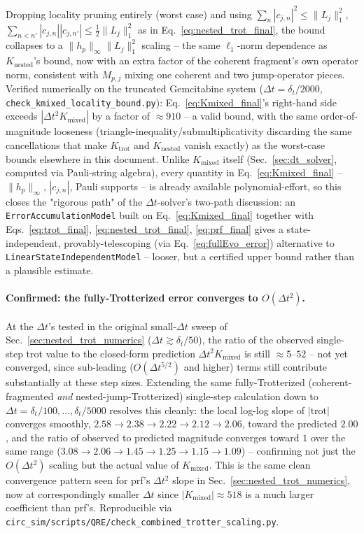 \documentclass[11pt]{article}
\newcommand{\Dt}{\Delta t}
\begin{document}
Dropping locality pruning entirely (worst case) and using $\sum_n|c_{j,n}|^2\le\|L_j\|_1^2$, $\sum_{n<n'}|c_{j,n}||c_{j,n'}|\le\tfrac12\|L_j\|_1^2$ as in Eq.~\eqref{eq:nested_trot_final}, the bound collapses to a $\|h_p\|_\infty\|L_j\|_1^2$ scaling -- the same $\ell_1$-norm dependence as $K_{\text{nested}}$'s bound, now with an extra factor of the coherent fragment's own operator norm, consistent with $M_{p,j}$ mixing one coherent and two jump-operator pieces. Verified numerically on the truncated Gemcitabine system ($\Dt=\delta_t/2000$, \texttt{check\_kmixed\_locality\_bound.py}): Eq.~\eqref{eq:Kmixed_final}'s right-hand side exceeds $|\Dt^2K_{\text{mixed}}|$ by a factor of $\approx910$ -- a valid bound, with the same order-of-magnitude looseness (triangle-inequality/submultiplicativity discarding the same cancellations that make $K_{\text{trot}}$ and $K_{\text{nested}}$ vanish exactly) as the worst-case bounds elsewhere in this document. Unlike $K_{\text{mixed}}$ itself (Sec.~\ref{sec:dt_solver}, computed via Pauli-string algebra), every quantity in Eq.~\eqref{eq:Kmixed_final} -- $\|h_p\|_\infty$, $|c_{j,n}|$, Pauli supports -- is already available polynomial-effort, so this closes the "rigorous path" of the $\Dt$-solver's two-path discussion: an \texttt{ErrorAccumulationModel} built on Eq.~\eqref{eq:Kmixed_final} together with Eqs.~\eqref{eq:trot_final}, \eqref{eq:nested_trot_final}, \eqref{eq:prf_final} gives a state-independent, provably-telescoping (via Eq.~\eqref{eq:fullEvo_error}) alternative to \texttt{LinearStateIndependentModel} -- looser, but a certified upper bound rather than a plausible estimate.

\paragraph{Confirmed: the fully-Trotterized error converges to \texorpdfstring{$O(\Dt^2)$}{O(Dt\^{}2)}.} At the $\Dt$'s tested in the original small-$\Dt$ sweep of Sec.~\ref{sec:nested_trot_numerics} ($\Dt\gtrsim\delta_t/50$), the ratio of the observed single-step trot value to the closed-form prediction $\Dt^2K_{\text{mixed}}$ is still $\approx5$--$52$ -- not yet converged, since sub-leading ($O(\Dt^{5/2})$ and higher) terms still contribute substantially at these step sizes. Extending the same fully-Trotterized (coherent-fragmented \emph{and} nested-jump-Trotterized) single-step calculation down to $\Dt=\delta_t/100,\ldots,\delta_t/5000$ resolves this cleanly: the local log-log slope of $|\text{trot}|$ converges smoothly, $2.58\to2.38\to2.22\to2.12\to2.06$, toward the predicted $2.00$, and the ratio of observed to predicted magnitude converges toward $1$ over the same range ($3.08\to2.06\to1.45\to1.25\to1.15\to1.09$) -- confirming not just the $O(\Dt^2)$ scaling but the actual value of $K_{\text{mixed}}$. This is the same clean convergence pattern seen for prf's $\Dt^2$ slope in Sec.~\ref{sec:nested_trot_numerics}, now at correspondingly smaller $\Dt$ since $|K_{\text{mixed}}|\approx518$ is a much larger coefficient than prf's. Reproducible via \texttt{circ\_sim/scripts/QRE/check\_combined\_trotter\_scaling.py}.
\end{document}
